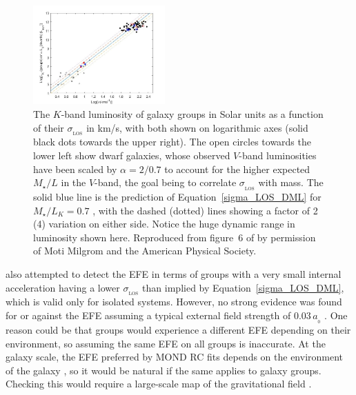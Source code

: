 \documentclass[fleqn,usenatbib,useAMS]{mnras} %
\begin{document}
\begin{figure}
	\centering
	\includegraphics[width=0.45\textwidth]{Milgrom_2019_Figure_6_AUTHOR}
	\caption{The $K$-band luminosity of galaxy groups in Solar units as a function of their $\sigma_{_\text{LOS}}$ in km/s, with both shown on logarithmic axes (solid black dots towards the upper right). The open circles towards the lower left show dwarf galaxies, whose observed $V$-band luminosities have been scaled by $\alpha = 2/0.7$ to account for the higher expected $M_{\star}/L$ in the $V$-band, the goal being to correlate $\sigma_{_\text{LOS}}$ with mass. The solid blue line is the prediction of Equation~\ref{sigma_LOS_DML} for $M_{\star}/L_K = 0.7$ \citep{McGaugh_Schombert_2014}, with the dashed (dotted) lines showing a factor of 2 (4) variation on either side. Notice the huge dynamic range in luminosity shown here. Reproduced from figure~6 of \citet{Milgrom_2019} by permission of Moti Milgrom and the American Physical Society.}
	\label{Milgrom_2019_Figure_6_AUTHOR}
\end{figure}

\citet{Milgrom_2019} also attempted to detect the EFE in terms of groups with a very small internal acceleration having a lower $\sigma_{_\text{LOS}}$ than implied by Equation~\ref{sigma_LOS_DML}, which is valid only for isolated systems. However, no strong evidence was found for or against the EFE assuming a typical external field strength of $0.03 \, a_{_0}$ \citep[e.g.][]{Famaey_2007, Banik_Ryan_2018, Haslbauer_2020}. One reason could be that groups would experience a different EFE depending on their environment, so assuming the same EFE on all groups is inaccurate. At the galaxy scale, the EFE preferred by MOND RC fits depends on the environment of the galaxy \citep{Chae_2020_EFE, Chae_2021}, so it would be natural if the same applies to galaxy groups. Checking this would require a large-scale map of the gravitational field \citep[e.g.][]{Desmond_2018}.
\end{document}

